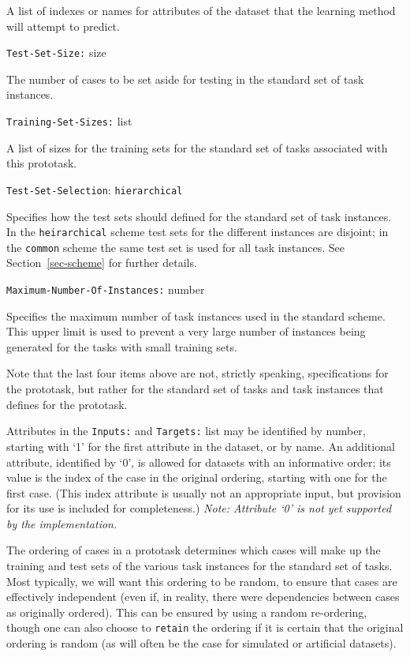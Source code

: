 \begin{list}{}{%
\setlength{\leftmargin}{1.1in}%
\setlength{\labelwidth}{0.7in}%
\setlength{\labelsep}{0.1in}%
}
A list of indexes or names for attributes of the dataset that the learning
method will attempt to predict.

\item[{\tt Test-Set-Size:}\hfill] size

The number of cases to be set aside for testing in the standard \delve{} set of
task instances.

\item[{\tt Training-Set-Sizes:}\hfill] list

A list of sizes for the training sets for the standard \delve{} set of tasks
associated with this prototask.

\item[{\tt Test-Set-Selection}:\hfill]
   {\tt hierarchical} 

Specifies how the test sets should defined for the standard set of task
instances. In the \texttt{heirarchical} scheme test sets for the different
instances are disjoint; in the {\tt common} scheme the same test set 
is used for all task instances.  See Section~\ref{sec-scheme} for further
details.

\item[{\tt Maximum-Number-Of-Instances:}\hfill]
   number

Specifies the maximum number of task instances used in the standard
\delve{} scheme.  This upper limit is used to prevent a very large number 
of instances being generated for the tasks with small training sets.

\end{list}\vspace{-5pt}

Note that the last four items above are not, strictly speaking,
specifications for the prototask, but rather for the standard set of
tasks and task instances that \delve{} defines for the prototask.

Attributes in the \texttt{Inputs:} and \texttt{Targets:} list may be
identified by number, starting with `1' for the first attribute in
the dataset, or by name.  An additional attribute, identified by
`0', is allowed for datasets with an informative order; its value is
the index of the case in the original ordering, starting with one for
the first case. (This index attribute is usually not an appropriate
input, but provision for its use is included for completeness.)
\emph{Note: Attribute `0' is not yet supported by the implementation.}

The ordering of cases in a prototask determines which cases will make
up the training and test sets of the various task instances for the
standard \delve{} set of tasks.  Most typically, we will want this
ordering to be random, to ensure that cases are effectively
independent (even if, in reality, there were dependencies between
cases as originally ordered).  This can be ensured by using a random
re-ordering, though one can also choose to \texttt{retain} the
ordering if it is certain that the original ordering is random (as
will often be the case for simulated or artificial datasets).

